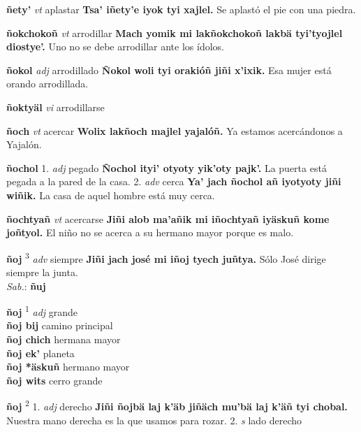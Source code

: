 \documentclass[10pt]{scrbook}
\newcommand{\entry}[1]{\textbf{#1}}
\newcommand{\onedefinition}[1]{#1.}
\newcommand{\defsuperscript}[1]{\textsuperscript{#1}}
\newcommand{\partofspeech}[1]{\textit{#1}}
\newcommand{\spanishtranslation}[1]{#1}
\newcommand{\cholexample}[1]{\textbf{#1}}
\newcommand{\exampletranslation}[1]{#1}
\newcommand{\dialectvariant}[1]{\\\textit{#1}:}
\newcommand{\dialectword}[1]{\textbf{#1}}
\newcommand{\secondaryentry}[1]{\\\textbf{#1}}
\newcommand{\secondtranslation}[1]{#1}
\begin{document}
\begin{multicols}{2}
\entry{ñety'}
\partofspeech{vt}
\spanishtranslation{aplastar}
\cholexample{Tsa' iñety'e iyok tyi xajlel.}
\exampletranslation{Se aplastó el pie con una piedra.}

\entry{ñokchokoñ}
\partofspeech{vt}
\spanishtranslation{arrodillar}
\cholexample{Mach yomik mi lakñokchokoñ lakbä tyi'tyojlel diostye'.}
\exampletranslation{Uno no se debe arrodillar ante los ídolos.}

\entry{ñokol}
\partofspeech{adj}
\spanishtranslation{arrodillado}
\cholexample{Ñokol woli tyi orakióñ jiñi x'ixik.}
\exampletranslation{Esa mujer está orando arrodillada.}

\entry{ñoktyäl}
\partofspeech{vi}
\spanishtranslation{arrodillarse}

\entry{ñoch}
\partofspeech{vt}
\spanishtranslation{acercar}
\cholexample{Wolix lakñoch majlel yajalóñ.}
\exampletranslation{Ya estamos acercándonos a Yajalón.}

\entry{ñochol}
\onedefinition{1}
\partofspeech{adj}
\spanishtranslation{pegado}
\cholexample{Ñochol ityi' otyoty yik'oty pajk'.}
\exampletranslation{La puerta está pegada a la pared de la casa.}
\onedefinition{2}
\partofspeech{adv}
\spanishtranslation{cerca}
\cholexample{Ya' jach ñochol añ iyotyoty jiñi wiñik.}
\exampletranslation{La casa de aquel hombre está muy cerca.}

\entry{ñochtyañ}
\partofspeech{vt}
\spanishtranslation{acercarse}
\cholexample{Jiñi alob ma'añik mi iñochtyañ iyäskuñ kome joñtyol.}
\exampletranslation{El niño no se acerca a su hermano mayor porque es malo.}

\entry{ñoj}
\defsuperscript{3}
\partofspeech{adv}
\spanishtranslation{siempre}
\cholexample{Jiñi jach josé mi iñoj tyech juñtya.}
\exampletranslation{Sólo José dirige siempre la junta.}
\dialectvariant{Sab.}
\dialectword{ñuj}

\entry{ñoj}
\defsuperscript{1}
\partofspeech{adj}
\spanishtranslation{grande}
\secondaryentry{ñoj bij}
\secondtranslation{camino principal}
\secondaryentry{ñoj chich}
\secondtranslation{hermana mayor}
\secondaryentry{ñoj ek'}
\secondtranslation{planeta}
\secondaryentry{ñoj *äskuñ}
\secondtranslation{hermano mayor}
\secondaryentry{ñoj wits}
\secondtranslation{cerro grande}

\entry{ñoj}
\defsuperscript{2}
\onedefinition{1}
\partofspeech{adj}
\spanishtranslation{derecho}
\cholexample{Jiñi ñojbä laj k'äb jiñäch mu'bä laj k'äñ tyi chobal.}
\exampletranslation{Nuestra mano derecha es la que usamos para rozar.}
\onedefinition{2}
\partofspeech{s}
\spanishtranslation{lado derecho}


\end{multicols}
\end{document}
